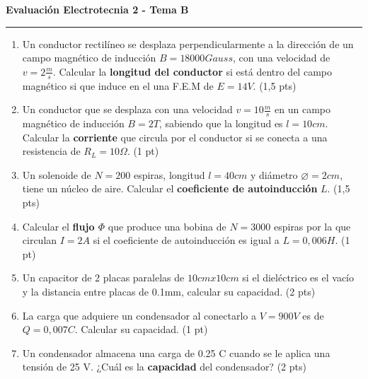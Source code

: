 \documentclass[a4paper,10pt]{article}
\begin{document}
\begin{minipage}[t][0.48\textheight][t]{0.48\textwidth}
  \centering \textbf{Evaluación Electrotecnia 2 - Tema B} \\
  \rule{\textwidth}{0.4pt}
  \begin{enumerate}
    \item Un conductor rectilíneo se desplaza perpendicularmente a la
      dirección de un campo magnético de inducción $B=18000Gauss$,
      con una velocidad de $v=2\frac{m}{s}$. Calcular la
      \textbf{longitud del conductor} si está dentro del campo
      magnético si que induce en el una F.E.M de $E=14V$. (1,5 pts)
    \item Un conductor que se desplaza con una velocidad
      $v=10\frac{m}{s}$  en un campo magnético de inducción $B=2T$,
      sabiendo que la longitud es $l=10cm$. Calcular la
      \textbf{corriente} que circula por el conductor si se conecta a
      una resistencia de $R_L=10\Omega$. (1 pt)
    \item Un solenoide de $N=200$ espiras, longitud $l=40cm$ y
      diámetro $\varnothing=2cm$, tiene un núcleo de aire. Calcular
      el \textbf{coeficiente de autoinducción} $L$. (1,5 pts)
    \item Calcular el \textbf{flujo $\Phi$} que produce una bobina de
      $N=3000$ espiras por la que circulan $I=2A$  si el coeficiente
      de autoinducción es igual a $L=0,006H$. (1 pt)
    \item Un capacitor de 2 placas paralelas de $10cmx10cm$ si el
      dieléctrico es el vacío y la distancia entre placas de 0.1mm,
      calcular su capacidad. (2 pts)
    \item La carga que adquiere un condensador al conectarlo a
      $V=900V$ es de $Q=0,007C$. Calcular su capacidad. (1 pt)
    \item Un condensador almacena una carga de 0.25 C cuando se le
      aplica una tensión de 25 V. ¿Cuál es la \textbf{capacidad} del
      condensador? (2 pts)
  \end{enumerate}
\end{minipage}

\vfill
\end{document}
